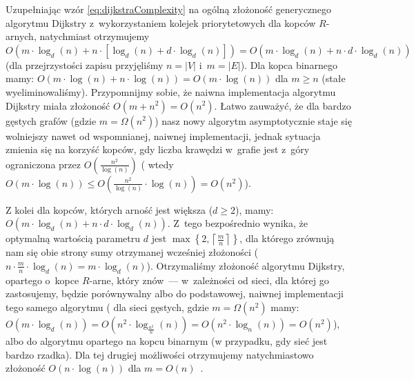 Uzupełniając wzór \ref{eq:dijkstraComplexity} na ogólną złożoność generycznego algorytmu Dijkstry z~wykorzystaniem kolejek priorytetowych dla kopców $R$-arnych, natychmiast otrzymujemy $O \left( m \cdot \log_{d} \left( n \right) + n \cdot \left[ \log_{d} \left( n \right) + d \cdot \log_{d} \left( n \right) \right] \right) = O \left( m \cdot \log_{d} \left( n \right) + n \cdot d \cdot \log_{d} \left( n \right) \right) $ (dla przejrzystości zapisu przyjęliśmy $ n = \left| V\right|$ i~$ m = \left| E \right|$). Dla kopca binarnego mamy: $O \left( m \cdot \log \left( n \right) + n \cdot \log \left( n \right) \right) = O \left( m \cdot \log \left( n \right) \right) $ dla $m \geqslant n $ (stałe wyeliminowaliśmy). Przypomnijmy sobie, że naiwna implementacja algorytmu Dijkstry miała złożoność $ O \left( m + n^{2} \right) = O \left( n^{2} \right)$. Łatwo zauważyć, że dla bardzo gęstych grafów (gdzie $ m = \Omega \left( n^{2} \right) $) nasz nowy algorytm asymptotycznie staje się wolniejszy nawet od wspomnianej, naiwnej implementacji, jednak sytuacja zmienia się na korzyść kopców, gdy liczba krawędzi w~grafie jest z~góry ograniczona przez $ O \left( \frac{n^{2}}{ \log \left( n \right) } \right)$ ( wtedy $ O \left( m \cdot \log \left( n \right) \right) \leqslant O \left( \frac{n^{2}}{\log \left( n \right)} \cdot \log \left( n \right) \right) = O \left( n^{2} \right)$).

Z kolei dla kopców, których arność jest większa ($d \geqslant 2$), mamy: $O \left( m \cdot \log_{d} \left( n \right) + n \cdot d \cdot \log_{d} \left( n \right) \right) $. Z~tego bezpośrednio wynika, że optymalną wartością parametru $d$ jest $ \max \left\{ 2, \left \lceil \frac{m}{n} \right \rceil \right\} $, dla którego zrównują nam się obie strony sumy otrzymanej wcześniej złożoności ($ n \cdot \frac{m}{n} \cdot \log_{d} \left( n \right) = m \cdot \log_{d} \left( n \right) $). Otrzymaliśmy złożoność algorytmu Dijkstry, opartego o~kopce $R$-arne, który znów~--- w~zależności od sieci, dla której go zastosujemy, będzie porównywalny albo do podstawowej, naiwnej implementacji tego samego algorytmu ( dla sieci gęstych, gdzie $ m = \Omega \left( n^{2} \right)$ mamy: $O \left( m \cdot \log_{d} \left( n \right) \right) = O \left( n^{2} \cdot \log_{\frac{n^{2}}{n}} \left( n \right) \right) = O \left( n^{2} \cdot \log_{n} \left( n \right) \right) = O \left( n^{2} \right)$), albo do algorytmu opartego na kopcu binarnym (w przypadku, gdy sieć jest bardzo rzadka). Dla tej drugiej możliwości otrzymujemy natychmiastowo złożoność $O \left( n \cdot \log \left( n \right) \right)$ dla $m = O \left( n \right)$~\cite[$2.2$]{OR}.

